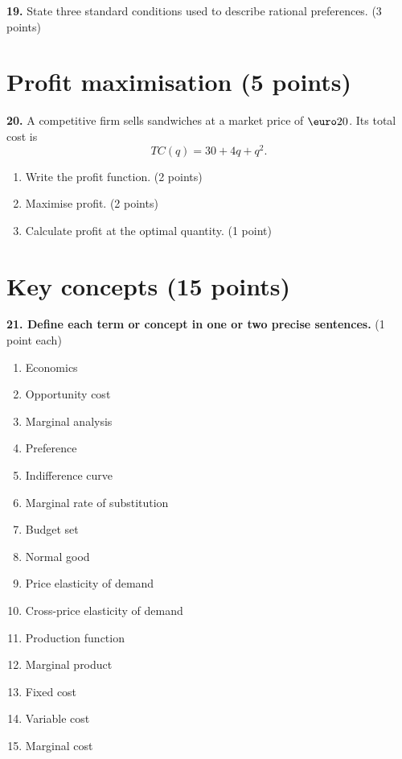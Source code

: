 \documentclass[11pt,a4paper]{article}
\begin{document}
\vspace{0.7em}
\textbf{19.} State three standard conditions used to describe rational
preferences. \hfill (3 points)

\vfill
\newpage
\section{Profit maximisation \hfill (5 points)}

\textbf{20.} A competitive firm sells sandwiches at a market price of
\(\text{\euro}20\). Its total cost is
\[
TC(q)=30+4q+q^2.
\]
\begin{enumerate}[label=\textbf{\alph*.}]
  \item Write the profit function. \hfill (2 points)
  \item Maximise profit. \hfill (2 points)
  \item Calculate profit at the optimal quantity. \hfill (1 point)
\end{enumerate}

\vfill
\newpage
\section{Key concepts \hfill (15 points)}

\textbf{21. Define each term or concept in one or two precise sentences.}
\hfill (1 point each)

\begin{enumerate}[label=\textbf{\alph*.},itemsep=0.62em]
  \item Economics
  \item Opportunity cost
  \item Marginal analysis
  \item Preference
  \item Indifference curve
  \item Marginal rate of substitution
  \item Budget set
  \item Normal good
  \item Price elasticity of demand
  \item Cross-price elasticity of demand
  \item Production function
  \item Marginal product
  \item Fixed cost
  \item Variable cost
  \item Marginal cost
\end{enumerate}
\end{document}
